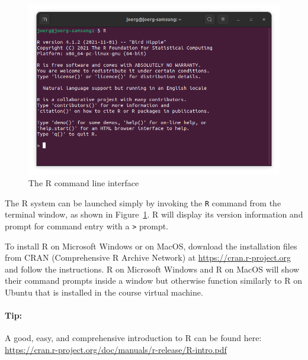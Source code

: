 \begin{figure}
\centering
\includegraphics[width=.8\textwidth]{screen1.png}
\caption{The R command line interface}
\label{fig:r}
\end{figure}

The R system can be launched simply by invoking the \texttt{R} command from the terminal window, as shown in Figure~\ref{fig:r}. R will display its version information and prompt for command entry with a \texttt{>} prompt. 

To install R on Microsoft Windows or on MacOS, download the installation files from CRAN (Comprehensive R Archive Network) at \url{https://cran.r-project.org} and follow the instructions. R on Microsoft Windows and R on MacOS will show their command prompts inside a window but otherwise function similarly to R on Ubuntu that is installed in the course virtual machine.

\begin{tcolorbox}[colback=alert]
\paragraph*{Tip:}
A good, easy, and comprehensive introduction to R can be found here: \url{https://cran.r-project.org/doc/manuals/r-release/R-intro.pdf}
\end{tcolorbox}

